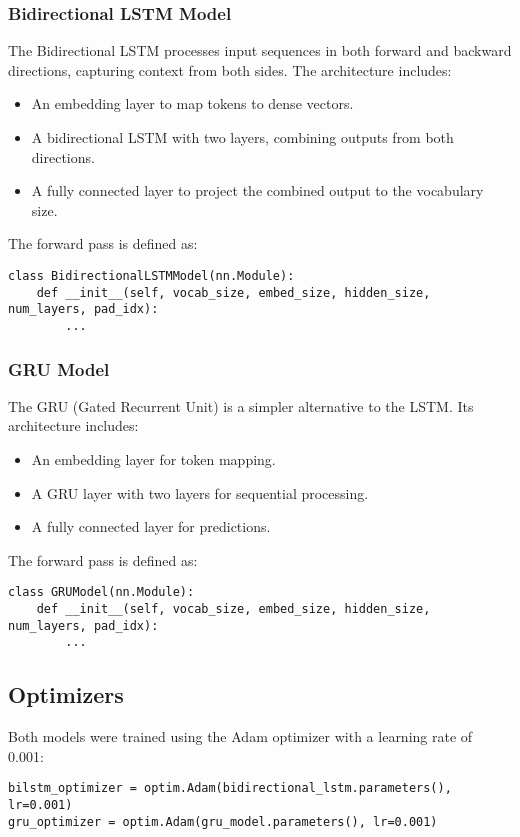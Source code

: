 \documentclass{article}
\begin{document}
\subsubsection{Bidirectional LSTM Model}
The Bidirectional LSTM processes input sequences in both forward and backward directions, capturing context from both sides. The architecture includes:
\begin{itemize}
    \item An embedding layer to map tokens to dense vectors.
    \item A bidirectional LSTM with two layers, combining outputs from both directions.
    \item A fully connected layer to project the combined output to the vocabulary size.
\end{itemize}

The forward pass is defined as:
\begin{verbatim}
class BidirectionalLSTMModel(nn.Module):
    def __init__(self, vocab_size, embed_size, hidden_size, num_layers, pad_idx):
        ...
\end{verbatim}

\subsubsection{GRU Model}
The GRU (Gated Recurrent Unit) is a simpler alternative to the LSTM. Its architecture includes:
\begin{itemize}
    \item An embedding layer for token mapping.
    \item A GRU layer with two layers for sequential processing.
    \item A fully connected layer for predictions.
\end{itemize}

The forward pass is defined as:
\begin{verbatim}
class GRUModel(nn.Module):
    def __init__(self, vocab_size, embed_size, hidden_size, num_layers, pad_idx):
        ...
\end{verbatim}

\subsection{Optimizers}
Both models were trained using the Adam optimizer with a learning rate of 0.001:
\begin{verbatim}
bilstm_optimizer = optim.Adam(bidirectional_lstm.parameters(), lr=0.001)
gru_optimizer = optim.Adam(gru_model.parameters(), lr=0.001)
\end{verbatim}
\end{document}
